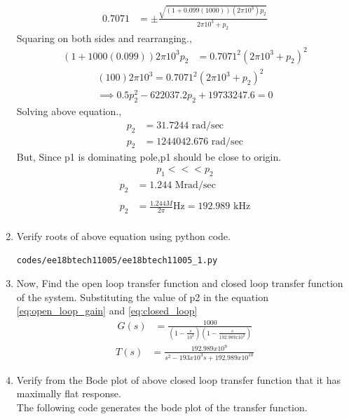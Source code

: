 \begin{enumerate}[label=\thesubsection.\arabic*.,ref=\thesubsection.\theenumi]
\begin{align}
    0.7071 &= \pm{\frac{\sqrt{(1+0.099(1000))(2\pi10^3)p_2}}{2\pi10^3+p_2}}
\end{align}
Squaring on both sides and rearranging.,
\begin{align}
    (1+1000(0.099))2\pi10^3p_2 &= 0.7071^2{(2\pi10^3+p_2)}^2
\end{align}
\begin{align}
    (100)2\pi10^3 = 0.7071^2(2\pi10^3+p_2)^2\\
    \implies 0.5p_2^2-622037.2p_2+19733247.6=0
\end{align}
Solving above equation.,
\begin{align}
p_2 &= 31.7244 \text{ rad/sec}\\
p_2 &= 1244042.676 \text{ rad/sec}
\end{align}
But, Since p1 is dominating pole,p1 should be close to origin.
\begin{align}
    p_1 <<< p_2
\end{align}
\begin{align}
p_2 &= 1.244\text{ Mrad/sec}\\
\\
p_2 &= \frac{1.244M}{2\pi} \text{Hz}= 192.989\text{ kHz}\\
\end{align}
\item Verify roots of above equation using python code.
\begin{lstlisting}
codes/ee18btech11005/ee18btech11005_1.py
\end{lstlisting}
\item Now, Find the open loop transfer function and closed loop transfer function of the system.
\solution Substituting the value of p2 in  the equation \ref{eq:open_loop_gain} and \ref{eq:closed_loop}
\begin{align}
     G(s) &= \frac{1000}{(1-\frac{s}{10^3})(1-\frac{s}{192.989x10^3})}
\end{align}
\begin{align}
    T(s) &= \frac{192.989x10^9}{s^2-193x10^3s+192.989x10^{10}}
\end{align}
\item Verify from the Bode plot of above closed loop transfer function that it has maximally flat response.\\
\solution The following code generates the bode plot of the transfer function.
\begin{lstlisting}

\end{lstlisting}
\end{enumerate}
